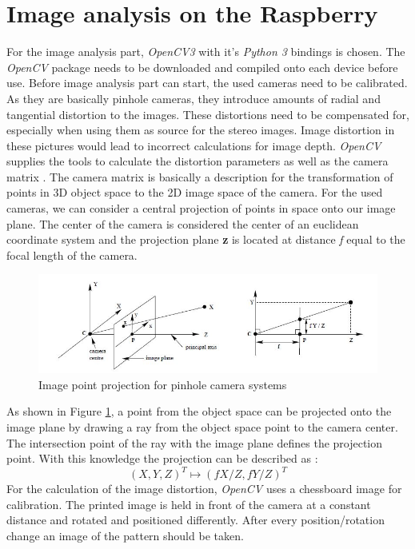 \section{Image analysis on the Raspberry}
For the image analysis part, \textit{OpenCV3} with it's \textit{Python 3} bindings is chosen. The \textit{OpenCV} package needs to be downloaded and compiled onto each device before use.
Before image analysis part can start, the used cameras need to be calibrated. As they are basically pinhole cameras, they introduce amounts of radial and tangential distortion to the images. These distortions need to be compensated for, especially when using them as source for the stereo images. Image distortion in these pictures would lead to incorrect calculations for image depth.
\textit{OpenCV} supplies the tools to calculate the distortion parameters as well as the camera matrix \cite{OpenCV.2018}.
The camera matrix is basically a description for the transformation of points in 3D object space to the 2D image space of the camera. For the used cameras, we can consider a central projection of points in space onto our image plane. The center of the camera is considered the center of an euclidean coordinate system and the projection plane \textbf{z} is located at distance \textit{f} equal to the focal length of the camera.
\begin{figure}[H]
\includegraphics[width=\textwidth]{images/pionhole.JPG}
\caption{Image point projection for pinhole camera systems \cite{Hartley.2000}}
\label{pinholecamera_mapping} 
\end{figure}
As shown in Figure \ref{pinholecamera_mapping}, a point from the object space can be projected onto the image plane by drawing a ray from the object space point to the camera center. The intersection point of the ray with the image plane defines the projection point. With this knowledge the projection can be described as :
\begin{equation}
(X,Y,Z)^{T} \mapsto (fX/Z,fY/Z)^{T}
\end{equation}
For the calculation of the image distortion, \textit{OpenCV} uses a chessboard image for calibration. The printed image is held in front of the camera at a constant distance and rotated and positioned differently. After every position/rotation change an image of the pattern should be taken.
